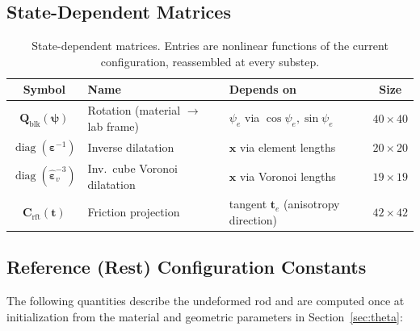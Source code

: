 \documentclass[11pt]{article}
\newcommand{\vect}[1]{\mathbf{#1}}
\newcommand{\mat}[1]{\mathbf{#1}}
\begin{document}
\subsection{State-Dependent Matrices}
\label{sec:state-dependent-matrices}

\begin{table}[H]
  \centering
  \renewcommand{\arraystretch}{1.3}
  \begin{tabular}{cllc}
    \toprule
    Symbol & Name & Depends on & Size \\
    \midrule
    $\mat{Q}_{\text{blk}}(\bm{\psi})$ & Rotation (material $\to$ lab frame) & $\psi_e$ via $\cos\psi_e, \sin\psi_e$ & $40 \times 40$ \\
    $\operatorname{diag}(\bm{\varepsilon}^{-1})$ & Inverse dilatation & $\vect{x}$ via element lengths & $20 \times 20$ \\
    $\operatorname{diag}(\hat{\bm{\varepsilon}}_v^{-3})$ & Inv.\ cube Voronoi dilatation & $\vect{x}$ via Voronoi lengths & $19 \times 19$ \\
    $\mat{C}_{\text{rft}}(\vect{t})$ & Friction projection & tangent $\vect{t}_e$ (anisotropy direction) & $42 \times 42$ \\
    \bottomrule
  \end{tabular}
  \caption{State-dependent matrices.  Entries are nonlinear functions of the current configuration, reassembled at every substep.}
  \label{tab:state-dependent-matrices}
\end{table}

\subsection{Reference (Rest) Configuration Constants}
\label{sec:rest-constants}

The following quantities describe the undeformed rod and are computed once at initialization from the material and geometric parameters in Section~\ref{sec:theta}:
\end{document}
